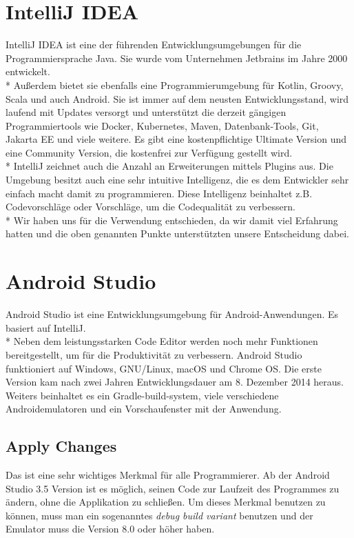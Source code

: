 \section{IntelliJ IDEA}
\author{Benjamin Besic}

IntelliJ IDEA ist eine der führenden Entwicklungsumgebungen für die Programmiersprache Java. Sie wurde vom Unternehmen Jetbrains im Jahre 2000 entwickelt.
\\* Außerdem bietet sie ebenfalls eine Programmierumgebung für Kotlin, Groovy, Scala und auch Android.
 Sie ist immer auf dem neusten Entwicklungsstand, wird laufend mit Updates versorgt und unterstützt die derzeit gängigen Programmiertools
wie Docker, Kubernetes, Maven, Datenbank-Tools, Git, Jakarta EE und viele weitere.
Es gibt eine kostenpflichtige Ultimate Version und eine Community Version, die kostenfrei zur Verfügung gestellt wird.
\\* IntelliJ zeichnet auch die Anzahl an Erweiterungen mittels Plugins aus. Die Umgebung besitzt auch eine
sehr intuitive Intelligenz, die es dem Entwickler sehr einfach macht damit zu programmieren. Diese Intelligenz beinhaltet z.B. Codevorschläge oder Vorschläge, um die Codequalität zu verbessern.
\cite{IntJ} \\*
Wir haben uns für die Verwendung entschieden, da wir damit viel Erfahrung hatten und die oben genannten Punkte
unterstützten unsere Entscheidung dabei.

\pagebreak
\section{Android Studio}
\cite{JetpackCompose-Overview}
\author{Bozidar Spasenovic}
Android Studio ist eine Entwicklungsumgebung für Android-Anwendungen. Es basiert auf IntelliJ.
\\* 
Neben dem leistungsstarken Code Editor werden noch mehr Funktionen bereitgestellt, um für die Produktivität zu verbessern. 
Android Studio funktioniert auf Windows, GNU/Linux, macOS und Chrome OS. Die erste Version kam nach zwei Jahren Entwicklungsdauer am 8. Dezember 2014 heraus.
Weiters beinhaltet es ein Gradle-build-system, viele verschiedene Androidemulatoren und ein Vorschaufenster mit der Anwendung.

\subsection{Apply Changes}
\cite{Android-Studio-ApplyChange}
Das ist eine sehr wichtiges Merkmal für alle Programmierer. Ab der Android Studio 3.5 Version ist es möglich, seinen Code
zur Laufzeit des Programmes zu ändern, ohne die Applikation zu schließen. Um dieses Merkmal benutzen zu können, muss man ein sogenanntes \textit{debug build variant} benutzen
und der Emulator muss die Version 8.0 oder höher haben.

